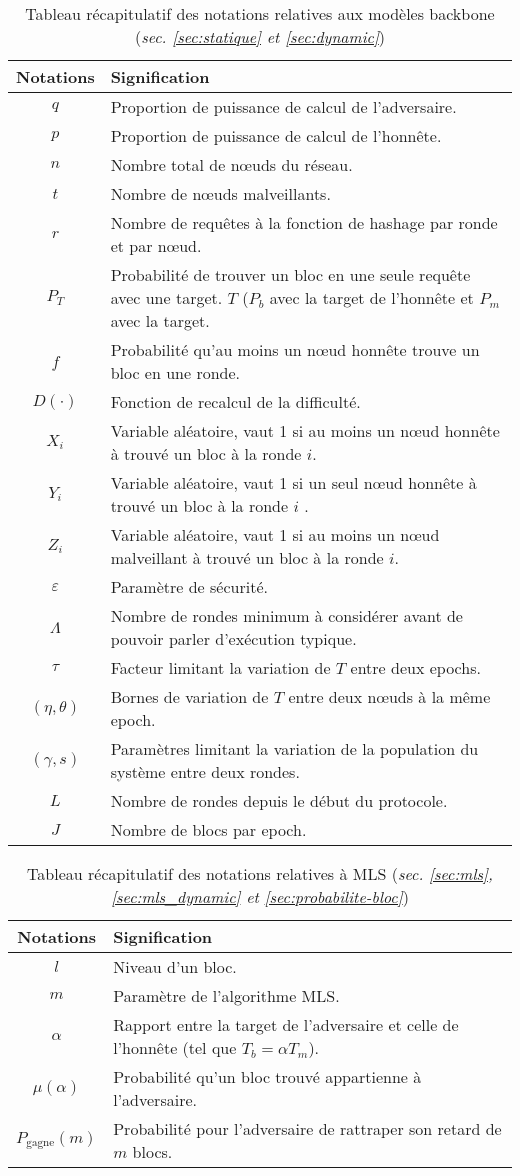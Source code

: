 \begin{table}[htb!]
	\centering
	\begin{tabular}{|c||M{13cm}|}
		\hline
			\textbf{Notations} & \textbf{Signification} \tabularnewline
		\hline
			$q$ & Proportion de 	puissance de calcul de l'adversaire. \tabularnewline
			$p$ & Proportion de puissance de calcul de l'honnête. \tabularnewline 
			$n$ & Nombre total de nœuds du réseau. \tabularnewline
			$t$ & Nombre de nœuds malveillants. \tabularnewline
			$r$ & Nombre de requêtes à la fonction de hashage par ronde et par nœud.
			\tabularnewline 
			$P_T$ & Probabilité de trouver un bloc en une seule requête avec une target.
			$T$ ($P_b$ avec la target de l'honnête et $P_m$ avec la target.
			\tabularnewline
			$f$ & Probabilité qu'au moins un nœud honnête trouve un bloc en une ronde.
			\tabularnewline
			$D(\cdot)$ & Fonction de recalcul de la difficulté. \tabularnewline
			$X_i$ & Variable aléatoire, vaut 1 si au moins un nœud honnête à trouvé un
			bloc à la ronde $i$. \tabularnewline
			$Y_i$ & Variable aléatoire, vaut 1 si un seul nœud honnête à trouvé un 
			bloc à la ronde $i$ .\tabularnewline
			$Z_i$ & Variable aléatoire, vaut 1 si au moins un nœud malveillant à
			trouvé un bloc à la ronde $i$. \tabularnewline
			$\varepsilon$ & Paramètre de sécurité. \tabularnewline
			$\Lambda$ & Nombre de rondes minimum à considérer avant de pouvoir parler
			d'exécution typique. \tabularnewline
			$\tau$ & Facteur limitant la variation de $T$ entre deux epochs.
			\tabularnewline
			$(\eta, \theta)$ & Bornes  de variation de $T$ entre deux nœuds à la même
			epoch. \tabularnewline
			$(\gamma, s)$ & Paramètres limitant la variation de la population du
			système entre deux rondes. \tabularnewline
			$L$ & Nombre de rondes depuis le début du protocole. \tabularnewline
			$J$ & Nombre de blocs par epoch. \tabularnewline
		\hline
	\end{tabular}
	\caption{Tableau récapitulatif des notations relatives aux modèles backbone
	(\textit{sec. \ref{sec:statique} et \ref{sec:dynamic}})}
	\label{tab:notations-modeles}
\end{table}


\begin{table}[htb!]
	\centering
	\begin{tabular}{|c||M{13cm}|}
		\hline
			\textbf{Notations} & \textbf{Signification} \tabularnewline
		\hline
			$l$ & Niveau d'un bloc. \tabularnewline
			$m$ & Paramètre de l'algorithme MLS. \tabularnewline		
			$\alpha$ & Rapport entre la target de l'adversaire et celle de l'honnête
			(tel que $T_b = \alpha T_m$). \tabularnewline
			$\mu(\alpha)$ & Probabilité qu'un bloc trouvé appartienne à l'adversaire.
			\tabularnewline
			$P_{\text{gagne}}(m)$ & Probabilité pour l'adversaire de rattraper son
			retard de $m$ blocs. \tabularnewline
		\hline
	\end{tabular}
	\caption{Tableau récapitulatif des notations relatives à MLS (\textit{sec.
	\ref{sec:mls}, \ref{sec:mls_dynamic} et \ref{sec:probabilite-bloc}})}
	\label{tab:notations-mls}
\end{table}


